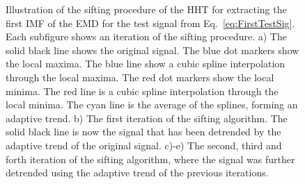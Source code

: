 \documentclass[a4paper]{IEEEtran}
\begin{document}
\begin{figure}[ht]
	\centering
	\label{fig:HHTDemo}
	\caption{Illustration of the sifting procedure of the HHT for extracting the first IMF of the EMD for the test signal from Eq.~\ref{eq:FirstTestSig}. Each subfigure shows an iteration of the sifting procedure. a) The solid black line shows the original signal. The blue dot markers show the local maxima. The blue line show a cubic spline interpolation through the local maxima. The red dot markers show the local minima. The red line is a cubic spline interpolation through the local minima. The cyan line is the average of the splines, forming an adaptive trend. b) The first iteration of the sifting algorithm. The solid black line is now the signal that has been detrended by the adaptive trend of the original signal. c)-e) The second, third and forth iteration of the sifting algorithm, where the signal was further detrended using the adaptive trend of the previous iterations.}
\end{figure}
\end{document}
